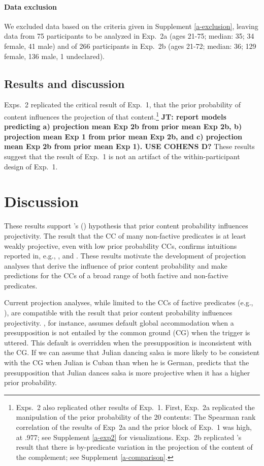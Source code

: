 \documentclass[11pt,fleqn]{article}
\newcommand{\6}{\mbox{$[\hspace*{-.6mm}[$}}
\newcommand{\9}{\mbox{$]\hspace*{-.6mm}]$}}
\newcommand{\citepos}[1]{\citeauthor{#1}'s \citeyear{#1}}
\newcommand{\citetpos}[1]{\citeauthor{#1}'s (\citeyear{#1})}
\newcommand{\jt}[1]{\textbf{\color{blue}JT: #1}}
\begin{document}
\paragraph{Data exclusion} We excluded data based on the criteria given in Supplement \ref{a-exclusion}, leaving data from 75 participants to be analyzed in Exp.~2a (ages 21-75; median: 35; 34 female, 41 male) and of 266 participants in Exp.~2b (ages 21-72; median: 36; 129 female, 136 male, 1 undeclared).

\subsection{Results and discussion}

Exps.~2 replicated the critical result of Exp.~1, that the prior probability of content influences the projection of that content.\footnote{Exps.~2 also replicated other results of Exp.~1. First, Exp.~2a replicated the manipulation of the prior probability of the 20 contents: The Spearman rank correlation of the results of Exp~2a and the prior block of Exp.~1 was high, at .977; see Supplement \ref{a-exp2} for visualizations. Exp.~2b replicated \citepos{tonhauser-degen-factive} result that there is by-predicate variation in the projection of the content of the complement; see Supplement \ref{a-comparison}.} \jt{report models predicting a) projection mean Exp 2b from prior mean Exp 2b, b) projection mean Exp 1 from prior mean Exp 2b, and c) projection mean Exp 2b from prior mean Exp 1). USE COHENS D?} These results suggest that the result of Exp.~1 is not an artifact of the within-participant design of Exp.~1.

\section{Discussion}\label{s4}

These results support \citetpos{tbd-variability} hypothesis that prior content probability influences projectivity. The result that the CC of many non-factive predicates is at least weakly projective, even with low prior probability CCs, confirms intuitions reported in, e.g., \citealt{schlenker10}, \citealt{anand-hacquard2014} and \citealt{spector-egre2015}. These results motivate the development of projection analyses that derive the influence of prior content probability and make predictions for the CCs of a broad range of both factive and non-factive predicates.

Current projection analyses, while limited to the CCs of factive predicates (e.g., \citealt{heim83,vds92,abrusan2011,brst-salt10,brst-ar}), are compatible with the result that prior content probability influences projectivity. \citealt{heim83}, for instance, assumes default global accommodation when a presupposition is not entailed by the common ground (CG) when the trigger is uttered. This default is overridden when the presupposition is inconsistent with the CG. If we can assume that Julian dancing salsa is more likely to be consistent with the CG when Julian is Cuban than when he is German, \citealt{heim83} predicts that the presupposition that Julian dances salsa is more projective when it has a higher prior probability. 
\end{document}
